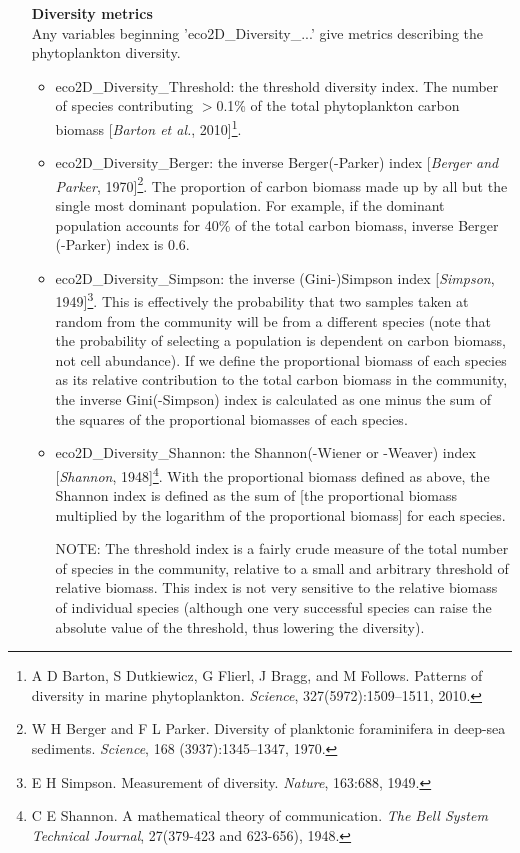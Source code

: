 \documentclass[11pt,fleqn]{book} %
\begin{document}
\begin{itemize}[noitemsep]
\item[\textbf{Diversity metrics}] \
\\Any variables beginning '\textsf{\footnotesize eco2D\_Diversity\_...}' give metrics describing the {phytoplankton} diversity.
\vspace{1mm}
\begin{itemize}[noitemsep]
\item \textsf{\footnotesize eco2D\_Diversity\_Threshold}: the threshold diversity index. The number of species contributing $>$0.1\% of the total phytoplankton carbon biomass [\textit{Barton et al.}, 2010]\footnote{A D Barton, S Dutkiewicz, G Flierl, J Bragg, and M Follows. Patterns of diversity in marine phytoplankton. \textit{Science}, 327(5972):1509–1511, 2010.}.
\item \textsf{\footnotesize eco2D\_Diversity\_Berger}: the inverse Berger(-Parker) index  [\textit{Berger and Parker}, 1970]\footnote{W H Berger and F L Parker. Diversity of planktonic foraminifera in deep-sea sediments. \textit{Science}, 168 (3937):1345–1347, 1970.}. The proportion of carbon biomass made up by all but the single most dominant population. For example, if the dominant population accounts for 40\% of the total carbon biomass, inverse Berger (-Parker) index is 0.6.
\item \textsf{\footnotesize eco2D\_Diversity\_Simpson}: the inverse (Gini-)Simpson index [\textit{Simpson}, 1949]\footnote{E H Simpson. Measurement of diversity. \textit{Nature}, 163:688, 1949.}. This is effectively the probability that two samples taken at random from the community will be from a different species (note that the probability of selecting a population is dependent on carbon biomass, not cell abundance). If we define the proportional biomass of each species as its relative contribution to the total carbon biomass in the community, the inverse Gini(-Simpson) index is calculated as one minus the sum of the squares of the proportional biomasses of each species.
\item \textsf{\footnotesize eco2D\_Diversity\_Shannon}: the Shannon(-Wiener or -Weaver) index  [\textit{Shannon}, 1948]\footnote{C E Shannon. A mathematical theory of communication. \textit{The Bell System Technical Journal}, 27(379-423 and 623-656), 1948.}. With the proportional biomass defined as above, the Shannon index is defined as the sum of [the proportional biomass multiplied by the logarithm of the proportional biomass] for each species.
\item[NOTE:]The threshold index is a fairly crude measure of the total number of species in the community, relative to a small and arbitrary threshold of relative biomass. This index is not very sensitive to the relative biomass of individual species (although one very successful species can raise the absolute value of the threshold, thus lowering the diversity).

\end{itemize}
\end{itemize}
\end{document}
